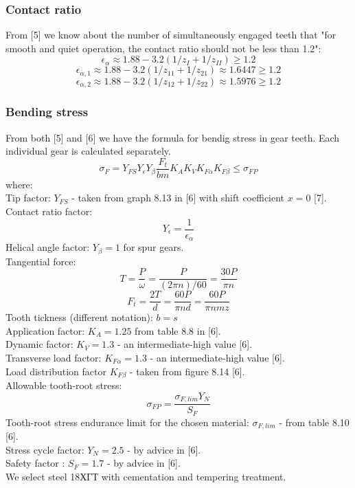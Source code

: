 \documentclass{article}
\begin{document}
\subsubsection{Contact ratio}
From [5] we know about the number of simultaneously engaged teeth that "for smooth and quiet operation, the contact ratio should not be less than 1.2":
$$ \epsilon_\alpha \approx 1.88 - 3.2 (1 / z_I + 1 / z_{II}) \geq 1.2 $$
$$ \epsilon_{\alpha, 1} \approx 1.88 - 3.2 (1 / z_{11} + 1 / z_{21}) \approx 1.6447 \geq 1.2 $$
$$ \epsilon_{\alpha, 2} \approx 1.88 - 3.2 (1 / z_{12} + 1 / z_{22}) \approx 1.5976 \geq 1.2 $$
\subsubsection{Bending stress}
From both [5] and [6] we have the formula for bendig stress in gear teeth.
Each individual gear is calculated separately.
\begin{equation} \sigma_F = Y_{FS} Y_\epsilon Y_\beta \frac{F_t}{b m} K_A K_V K_{F\alpha} K_{F\beta} \leq \sigma_{FP} \end{equation}
where: \\
Tip factor: $Y_{FS}$ - taken from graph 8.13 in [6] with shift coefficient $x = 0$ [7]. \\
Contact ratio factor: $$Y_\epsilon = \frac{1}{\epsilon_\alpha}$$
Helical angle factor: $Y_\beta = 1$ for spur gears. \\
Tangential force:
$$ T = \frac{P}{\omega} = \frac{P}{(2 \pi n) / 60} = \frac{30 P}{\pi n}$$
$$ F_t = \frac{2 T}{d} =  \frac{60 P}{\pi n d}  = \frac{60 P}{\pi n m z}$$
Tooth tickness (different notation): $b = s$ \\
Application factor: $K_A = 1.25$ from table 8.8 in [6]. \\
Dynamic factor: $K_V = 1.3$ - an intermediate-high value [6]. \\
Transverse load factor: $K_{F\alpha} = 1.3$ - an intermediate-high value [6]. \\
Load distribution factor $K_{F\beta}$ - taken from figure 8.14 [6]. \\
Allowable tooth-root stress: $$\sigma_{FP} = \frac{\sigma_{F, lim} Y_N}{S_F}$$
Tooth-root stress endurance limit for the chosen material: $\sigma_{F, lim}$ - from table 8.10 [6]. \\
Stress cycle factor: $Y_N = 2.5$ - by advice in [6]. \\
Safety factor : $S_F = 1.7$ - by advice in [6]. \\[0.3cm]
We select steel 18ХГТ with cementation and tempering treatment.
\end{document}
